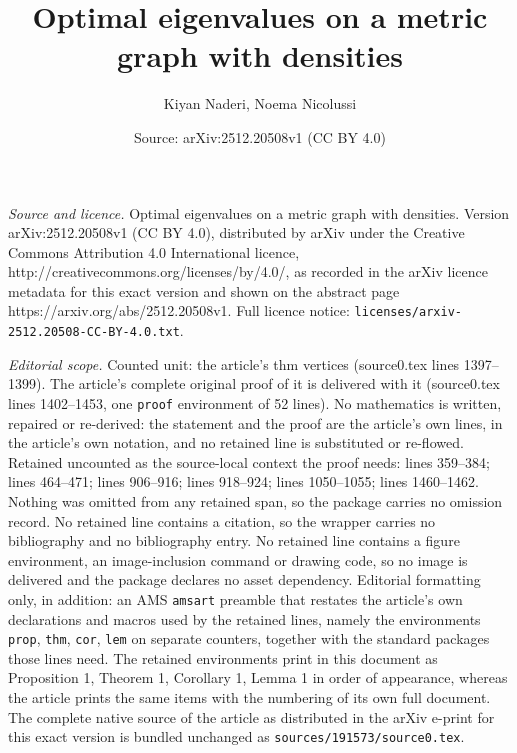 \documentclass[10pt,a4paper]{amsart}
\title{Optimal eigenvalues on a metric graph with densities}
\author{Kiyan Naderi, Noema Nicolussi}
\date{Source: arXiv:2512.20508v1 (CC BY 4.0)}
\begin{document}
\maketitle

\noindent\emph{Source and licence.} Optimal eigenvalues on a metric graph with densities. Version arXiv:2512.20508v1 (CC BY 4.0), distributed by arXiv under the Creative Commons Attribution 4.0 International licence, http://creativecommons.org/licenses/by/4.0/, as recorded in the arXiv licence metadata for this exact version and shown on the abstract page https://arxiv.org/abs/2512.20508v1. Full licence notice: \texttt{licenses/arxiv-2512.20508-CC-BY-4.0.txt}.\par\smallskip

\noindent\textit{Editorial scope.} Counted unit: the article's thm vertices (source0.tex lines 1397--1399). The article's complete original proof of it is delivered with it (source0.tex lines 1402--1453, one \texttt{proof} environment of 52 lines). No mathematics is written, repaired or re-derived: the statement and the proof are the article's own lines, in the article's own notation, and no retained line is substituted or re-flowed.  Retained uncounted as the source-local context the proof needs: lines 359--384; lines 464--471; lines 906--916; lines 918--924; lines 1050--1055; lines 1460--1462.  Nothing was omitted from any retained span, so the package carries no omission record.  No retained line contains a citation, so the wrapper carries no bibliography and no bibliography entry.  No retained line contains a figure environment, an image-inclusion command or drawing code, so no image is delivered and the package declares no asset dependency.  Editorial formatting only, in addition: an AMS \texttt{amsart} preamble that restates the article's own declarations and macros used by the retained lines, namely the environments \texttt{prop}, \texttt{thm}, \texttt{cor}, \texttt{lem} on separate counters, together with the standard packages those lines need.  The retained environments print in this document as Proposition 1, Theorem 1, Corollary 1, Lemma 1 in order of appearance, whereas the article prints the same items with the numbering of its own full document.  The complete native source of the article as distributed in the arXiv e-print for this exact version is bundled unchanged as \texttt{sources/191573/source0.tex}.
\end{document}

